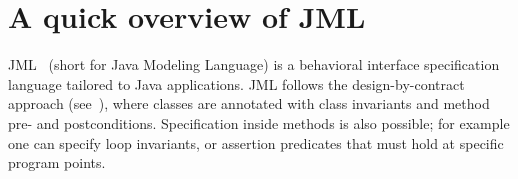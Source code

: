 


\section{A quick overview of JML} \label{prelim}
JML~\cite{JMLRefMan} (short for Java Modeling Language) is a behavioral interface specification language tailored to Java applications. JML 
follows the design-by-contract approach (see~\cite{M97oos}), where classes are annotated with class invariants and method pre- and postconditions. Specification
inside methods is also possible; for example one can specify loop invariants, or assertion predicates that must hold at specific program points. 

